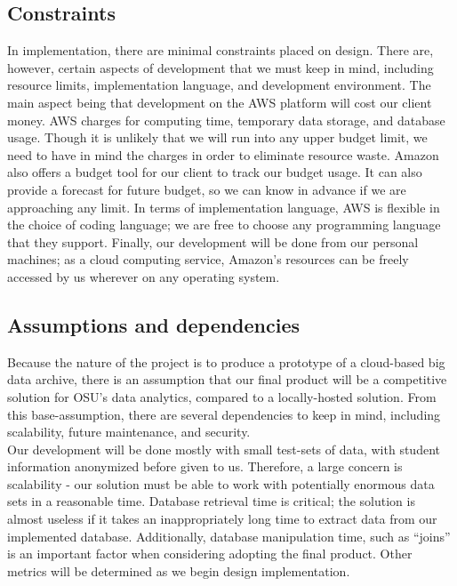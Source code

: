 \documentclass[10pt,draftclsnofoot,onecolumn,journal,compsoc]{IEEEtran}
\begin{document}
        \subsection{Constraints}
        In implementation, there are minimal constraints placed on design. There are, however, certain aspects of development that we must keep in mind, including resource limits, implementation language, and development environment. The main aspect being that development on the AWS platform will cost our client money. AWS charges for computing time, temporary data storage, and database usage. Though it is unlikely that we will run into any upper budget limit, we need to have in mind the charges in order to eliminate resource waste. Amazon also offers a budget tool for our client to track our budget usage. It can also provide a forecast for future budget, so we can know in advance if we are approaching any limit. In terms of implementation language, AWS is flexible in the choice of coding language; we are free to choose any programming language that they support. Finally, our development will be done from our personal machines; as a cloud computing service, Amazon’s resources can be freely accessed by us wherever on any operating system.

        \subsection{Assumptions and dependencies}
        Because the nature of the project is to produce a prototype of a cloud-based big data archive, there is an assumption that our final product will be a competitive solution for OSU’s data analytics, compared to a locally-hosted solution. From this base-assumption, there are several dependencies to keep in mind, including scalability, future maintenance, and security.\\ 
        
        \noindent Our development will be done mostly with small test-sets of data, with student information anonymized before given to us. Therefore, a large concern is scalability - our solution must be able to work with potentially enormous data sets in a reasonable time. Database retrieval time is critical; the solution is almost useless if it takes an inappropriately long time to extract data from our implemented database. Additionally, database manipulation time, such as “joins” is an important factor when considering adopting the final product. Other metrics will be determined as we begin design implementation.
\end{document}
